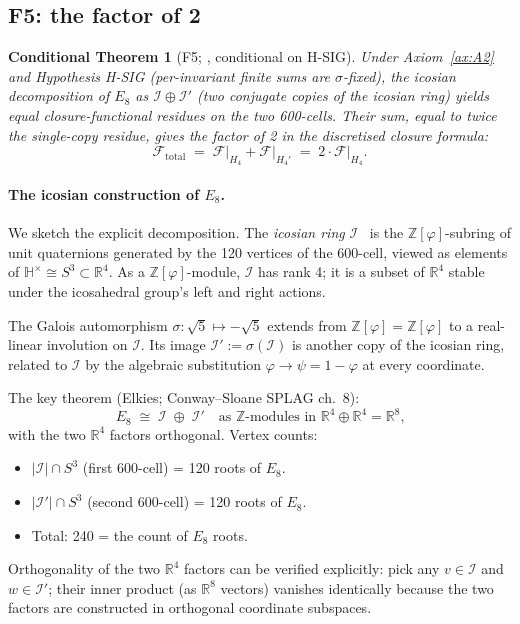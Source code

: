 \documentclass[11pt]{article}
\theoremstyle{plain}
\newtheorem{conditional}[theorem]{Conditional Theorem}
\theoremstyle{definition}
\theoremstyle{remark}
\newcommand{\Zphi}{\mathbb{Z}[\varphi]}
\newcommand{\Fcal}{\mathcal{F}}
\newcommand{\Ical}{\mathcal{I}}
\begin{document}
\subsection{F5: the factor of 2}\label{sec:cascade-F5}

\begin{conditional}[F5; \citealp{SmartXXXVI}, conditional on H-SIG]\label{thm:F5}
Under Axiom~\ref{ax:A2} and Hypothesis H-SIG (per-invariant finite sums are $\sigma$-fixed), the icosian decomposition of $E_8$ as $\Ical \oplus \Ical'$ (two conjugate copies of the icosian ring) yields equal closure-functional residues on the two 600-cells. Their sum, equal to twice the single-copy residue, gives the factor of 2 in the discretised closure formula:
\[
  \Fcal_{\mathrm{total}} \;=\; \Fcal\big|_{H_4} + \Fcal\big|_{H_4'} \;=\; 2 \cdot \Fcal\big|_{H_4}.
\]
\end{conditional}

\paragraph{The icosian construction of $E_8$.}\label{sec:hypersphere-icosian}
We sketch the explicit decomposition. The \emph{icosian ring} $\Ical$~\citep{Elkies1990, ConwaySloane} is the $\Zphi$-subring of unit quaternions generated by the 120 vertices of the 600-cell, viewed as elements of $\mathbb{H}^\times \cong S^3 \subset \mathbb{R}^4$. As a $\Zphi$-module, $\Ical$ has rank 4; it is a subset of $\mathbb{R}^4$ stable under the icosahedral group's left and right actions.

The Galois automorphism $\sigma: \sqrt 5 \mapsto -\sqrt 5$ extends from $\Zphi = \mathbb{Z}[\varphi]$ to a real-linear involution on $\Ical$. Its image $\Ical' := \sigma(\Ical)$ is another copy of the icosian ring, related to $\Ical$ by the algebraic substitution $\varphi \to \psi = 1 - \varphi$ at every coordinate.

The key theorem (Elkies; Conway--Sloane SPLAG ch.\ 8):
\begin{equation}\label{eq:elkies-icosian}
  E_8 \;\cong\; \Ical \;\oplus\; \Ical' \quad\text{as $\mathbb{Z}$-modules in $\mathbb{R}^4 \oplus \mathbb{R}^4 = \mathbb{R}^8$,}
\end{equation}
with the two $\mathbb{R}^4$ factors orthogonal. Vertex counts:
\begin{itemize}[leftmargin=2em]
\item $|\Ical| \cap S^3$ (first 600-cell) = 120 roots of $E_8$.
\item $|\Ical'| \cap S^3$ (second 600-cell) = 120 roots of $E_8$.
\item Total: 240 = the count of $E_8$ roots.
\end{itemize}
Orthogonality of the two $\mathbb{R}^4$ factors can be verified explicitly: pick any $v \in \Ical$ and $w \in \Ical'$; their inner product (as $\mathbb{R}^8$ vectors) vanishes identically because the two factors are constructed in orthogonal coordinate subspaces.
\end{document}
